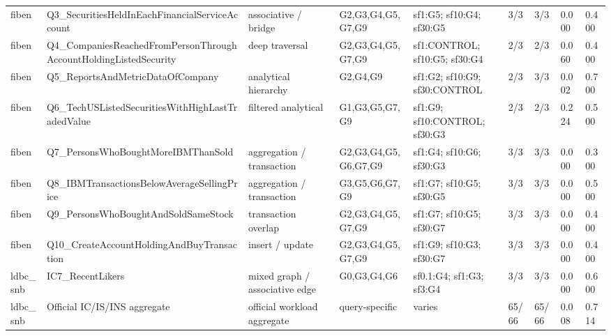 \begin{longtable}{lllllllll}
fiben & Q3\_SecuritiesHeldInEachFinancialServiceAccount & associative / bridge & G2,G3,G4,G5,G7,G9 & sf1:G5; sf10:G4; sf30:G5 & 3/3 & 3/3 & 0.000 & 0.400 \\
fiben & Q4\_CompaniesReachedFromPersonThroughAccountHoldingListedSecurity & deep traversal & G2,G3,G4,G5,G7,G9 & sf1:CONTROL; sf10:G5; sf30:G4 & 2/3 & 2/3 & 0.060 & 0.400 \\
fiben & Q5\_ReportsAndMetricDataOfCompany & analytical hierarchy & G2,G4,G9 & sf1:G2; sf10:G9; sf30:CONTROL & 2/3 & 3/3 & 0.002 & 0.700 \\
fiben & Q6\_TechUSListedSecuritiesWithHighLastTradedValue & filtered analytical & G1,G3,G5,G7,G9 & sf1:G9; sf10:CONTROL; sf30:G3 & 2/3 & 2/3 & 0.224 & 0.500 \\
fiben & Q7\_PersonsWhoBoughtMoreIBMThanSold & aggregation / transaction & G2,G3,G4,G5,G6,G7,G9 & sf1:G4; sf10:G6; sf30:G3 & 3/3 & 3/3 & 0.000 & 0.300 \\
fiben & Q8\_IBMTransactionsBelowAverageSellingPrice & aggregation / transaction & G3,G5,G6,G7,G9 & sf1:G7; sf10:G5; sf30:G5 & 3/3 & 3/3 & 0.000 & 0.500 \\
fiben & Q9\_PersonsWhoBoughtAndSoldSameStock & transaction overlap & G2,G3,G4,G5,G7,G9 & sf1:G7; sf10:G5; sf30:G7 & 3/3 & 3/3 & 0.000 & 0.400 \\
fiben & Q10\_CreateAccountHoldingAndBuyTransaction & insert / update & G2,G3,G4,G5,G7,G9 & sf1:G9; sf10:G3; sf30:G7 & 3/3 & 3/3 & 0.000 & 0.400 \\
ldbc\_snb & IC7\_RecentLikers & mixed graph / associative edge & G0,G3,G4,G6 & sf0.1:G4; sf1:G3; sf3:G4 & 3/3 & 3/3 & 0.000 & 0.600 \\
ldbc\_snb & Official IC/IS/INS aggregate & official workload aggregate & query-specific & varies & 65/66 & 65/66 & 0.008 & 0.714 \\
\bottomrule
\end{longtable}